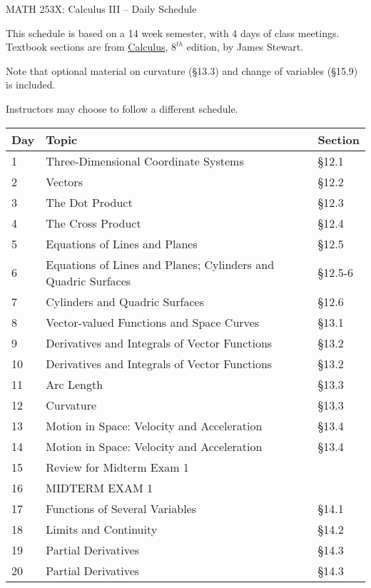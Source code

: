 \documentclass[11pt]{article}
\begin{document}
\centerline{MATH 253X: Calculus III -- Daily Schedule}

\bigskip

This schedule is based on a 14 week semester, with 4 days of class meetings. Textbook sections are from \underline{Calculus}, $8^{th}$ edition, by James Stewart.


Note that optional material on curvature (\S13.3) and change of variables (\S 15.9) is included. 

Instructors may choose to follow a different schedule. 

\bigskip

\centering
\begin{tabular}{|l|l|l|} %
\hline
Day& Topic &  Section\\
\hline 

1 & Three-Dimensional Coordinate Systems &\S12.1 \\
2 & Vectors  &\S12.2 \\
3 & The Dot Product & \S12.3 \\
4 & The Cross Product& \S 12.4 \\

5&Equations of Lines and Planes& \S12.5 \\
6&Equations of Lines and Planes; Cylinders and Quadric Surfaces& \S12.5-6 \\
7&Cylinders and Quadric Surfaces& \S12.6 \\
8& Vector-valued Functions and Space Curves& \S13.1 \\ 

9&Derivatives and Integrals of Vector Functions& \S13.2 \\
10&Derivatives and Integrals of Vector Functions& \S13.2 \\
11&Arc Length& \S13.3 \\ 
12&Curvature& \S13.3 \\ 

13&Motion in Space: Velocity and Acceleration& \S13.4 \\
14&Motion in Space: Velocity and Acceleration& \S13.4 \\
15& Review for Midterm Exam 1& \\
\hline
16& MIDTERM EXAM 1&   \\
\hline

17&Functions of Several Variables& \S14.1 \\ 
18&Limits and Continuity& \S14.2 \\
19&Partial Derivatives& \S14.3 \\ 
20&Partial Derivatives& \S14.3\\


\end{tabular}
\end{document}
